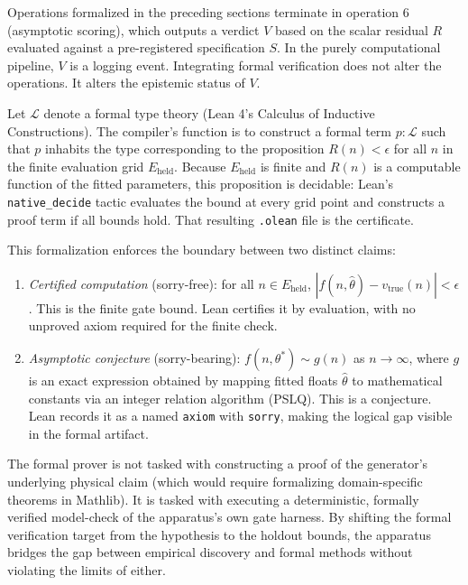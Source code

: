 \documentclass[
  11pt,
]{article}
\begin{document}
Operations formalized in the preceding sections terminate in operation 6
(asymptotic scoring), which outputs a verdict \(V\) based on the scalar
residual \(R\) evaluated against a pre-registered specification \(S\). In
the purely computational pipeline, \(V\) is a logging event. Integrating
formal verification does not alter the operations. It alters the epistemic
status of \(V\).

Let \(\mathcal{L}\) denote a formal type theory (Lean 4's Calculus of
Inductive Constructions). The compiler's function is to construct a formal
term \(p : \mathcal{L}\) such that \(p\) inhabits the type corresponding to
the proposition \(R(n) < \epsilon\) for all \(n\) in the finite evaluation
grid \(E_{\text{held}}\). Because \(E_{\text{held}}\) is finite and
\(R(n)\) is a computable function of the fitted parameters, this
proposition is decidable: Lean's \texttt{native\_decide} tactic evaluates
the bound at every grid point and constructs a proof term if all bounds
hold. That resulting \texttt{.olean} file is the certificate.

This formalization enforces the boundary between two distinct claims:

\begin{enumerate}
\def\labelenumi{\arabic{enumi}.}
\item
  \emph{Certified computation} (sorry-free): for all
  \(n \in E_{\text{held}}\),
  \(|f(n, \hat{\theta}) - v_{\text{true}}(n)| < \epsilon\). This is the
  finite gate bound. Lean certifies it by evaluation, with no unproved
  axiom required for the finite check.
\item
  \emph{Asymptotic conjecture} (sorry-bearing):
  \(f(n, \theta^*) \sim g(n)\) as \(n \to \infty\), where \(g\) is an
  exact expression obtained by mapping fitted floats \(\hat{\theta}\) to
  mathematical constants via an integer relation algorithm (PSLQ). This
  is a conjecture. Lean records it as a named \texttt{axiom} with
  \texttt{sorry}, making the logical gap visible in the formal artifact.
\end{enumerate}

The formal prover is not tasked with constructing a proof of the
generator's underlying physical claim (which would require formalizing
domain-specific theorems in Mathlib). It is tasked with executing a
deterministic, formally verified model-check of the apparatus's own gate
harness. By shifting the formal verification target from the hypothesis
to the holdout bounds, the apparatus bridges the gap between empirical
discovery and formal methods without violating the limits of either.
\end{document}
